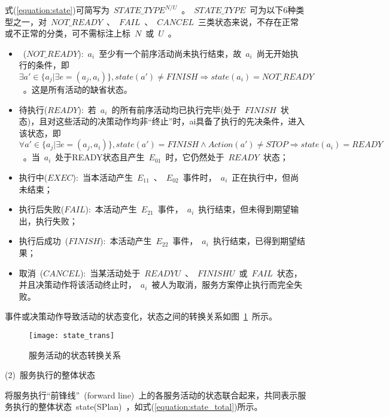 式(\ref{equation:state})可简写为~$STATE\_TYPE^{N/U}$~。~$STATE\_TYPE$~可为以下6种类型之一，对~$NOT\_READY$~、~$FAIL$~、~$CANCEL$~三类状态来说，不存在正常或不正常的分类，可不需标注上标~$N$~或~$U$~。

\begin{itemize}

\item ~($NOT\_READY$):~$a_i$~至少有一个前序活动尚未执行结束，故~$a_i$~尚无开始执行的条件，即~$\exists a' \in \{ {a_j}|\exists e = ( {{a_j},{a_i}} )\} ,state ( {a'} ) \ne FINISH \Rightarrow state ( {{a_i}} ) = NOT\_READY$~。这是所有活动的缺省状态。

\item 待执行($READY$):~若~$a_i$~的所有前序活动均已执行完毕(处于~$FINISH$~状态)，且对这些活动的决策动作均非“终止”时，ai具备了执行的先决条件，进入该状态，即~$\forall a' \in \{ {a_j}|\exists e = ( {{a_j},{a_i}} )\} ,state ( {a'} ) = FINISH \wedge Action(a') \ne STOP \Rightarrow state ( {{a_i}} ) = READY$~。当~$a_i$~处于READY状态且产生~$E_{01}$~时，它仍然处于~$READY$~状态；

\item 执行中($EXEC$):~当本活动产生~$E_{11}$~、~$E_{02}$~事件时，~$a_i$~正在执行中，但尚未结束；

\item 执行后失败($FAIL$):~本活动产生~$E_{21}$~事件，~$a_i$~执行结束，但未得到期望输出，执行失败；

\item 执行后成功~($FINISH$):~本活动产生~$E_{22}$~事件，~$a_i$~执行结束，已得到期望结果；

\item 取消~($CANCEL$):~当某活动处于~$READYU$~、~$FINISHU$~或~$FAIL$~状态，并且决策动作将该活动终止时，~$a_i$~被人为取消，服务方案停止执行而完全失败。
\end{itemize}

事件或决策动作导致活动的状态变化，状态之间的转换关系如图~\ref{figure:state_trans}~所示。
\begin{figure}[htbp]
    \centering
    \texttt{[image: state\_trans]}
    \caption{服务活动的状态转换关系}\label{figure:state_trans}
    \vspace{-1em}
\end{figure}

(2)~服务执行的整体状态

将服务执行“前锋线”~(forward line)~上的各服务活动的状态联合起来，共同表示服务执行的整体状态~state(SPlan)~，如式(\ref{equation:state_total})所示。


